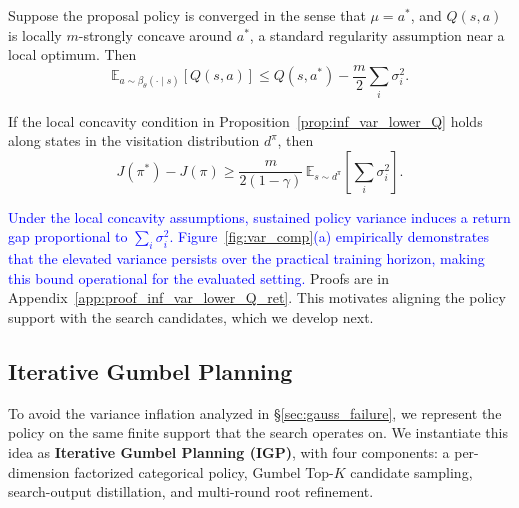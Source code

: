 \begin{proposition}
\label{prop:inf_var_lower_Q}
Suppose the proposal policy is converged in the sense that $\mu=a^*$, and $Q(s,a)$ is locally $m$-strongly concave around $a^*$, a standard regularity assumption near a local optimum. Then
\[
\mathbb{E}_{a\sim\beta_\theta(\cdot\mid s)}[Q(s,a)]
\le
Q(s,a^*) - \frac{m}{2}\sum_i \sigma_i^2.
\]
\end{proposition}

\begin{corollary}
\label{cor:persistent_variance_return_gap}
If the local concavity condition in Proposition~\ref{prop:inf_var_lower_Q} holds along states in the visitation distribution $d^\pi$, then
\[
J(\pi^*)-J(\pi)
\ge
\frac{m}{2(1-\gamma)}\,\mathbb{E}_{s\sim d^\pi}\!\left[\sum_{i} \sigma_i^2\right].
\]
\end{corollary}

\textcolor{blue}{Under the local concavity assumptions, sustained policy variance induces a return gap proportional to $\sum_i\sigma_i^2$. Figure~\ref{fig:var_comp}(a) empirically demonstrates that the elevated variance persists over the practical training horizon, making this bound operational for the evaluated setting.} Proofs are in Appendix~\ref{app:proof_inf_var_lower_Q_ret}. This motivates aligning the policy support with the search candidates, which we develop next.


\subsection{Iterative Gumbel Planning}
\label{sec:igp}

To avoid the variance inflation analyzed in \S\ref{sec:gauss_failure}, we represent the policy on the same finite support that the search operates on. We instantiate this idea as \textbf{Iterative Gumbel Planning (IGP)}, with four components: a per-dimension factorized categorical policy, Gumbel Top-$K$ candidate sampling, search-output distillation, and multi-round root refinement.

